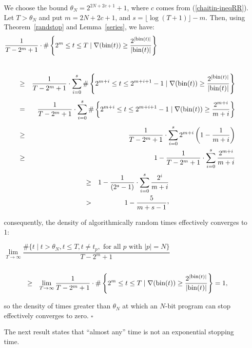 \documentclass[12pt,twoside,openright]{report}
\newcommand{\QED}{\hfill $\square$}
\newcommand{\bin}{\mbox{bin}}
\newcommand{\fbin}{\mbox{\rm \footnotesize{bin}}}
\newcommand{\myproof}{\noindent {\em Proof.}  }
\begin{document}
\myproof We choose the bound $\theta_{N} = 2^{2N+2c+1}+1$, where $c$ comes from (\ref{chaitin-ineqRR}).  Let $T> \theta_{N}$ and put $m = 2N+2c+1$, and $s = \lfloor \log (T+1)\rfloor -m$.  Then, using Theorem~\ref{randstop}  and Lemma~\ref{series}, we have:
\[ \frac{1}{T-2^{m} + 1} \cdot \#\left\{2^{m}\le t\le T \mid \nabla (\bin(t)) \ge \frac{2^{|\fbin (t)|}}{|\bin(t)|}\right\} \phantom{xxxxxxxxxxxxxxxxxxxxxxxx}\]\\[-4ex]
\begin{eqnarray*}
&\ge & \frac{1}{T-2^{m} + 1}\cdot  \sum_{i=0}^{s}\#\left\{2^{m+i}\le t\le 2^{m+i+1}-1\mid \nabla (\bin(t)) \ge \frac{2^{|\fbin (t)|}}{|\bin(t)|}\right\}  \\[1ex]
&= & \frac{1}{T-2^{m} + 1}\cdot \sum_{i=0}^{s}\#\left\{2^{m+i}\le t\le 2^{m+i+1}-1\mid \nabla (\bin(t)) \ge \frac{2^{m+i}}{m+i}\right\}  \\[1ex]
&\ge & \frac{1}{T-2^{m} + 1}\cdot \sum_{i=0}^{s} 2^{m+i} \left( 1 - \frac{1}{m+i}\right)\\
& \ge & 1 - \frac{1}{T-2^{m} + 1}\cdot \sum_{i=0}^{s}   \frac{2^{m+i}}{m+i}
\end{eqnarray*}
\begin{eqnarray*}
&\ge &  1 - \frac{1}{(2^{s} - 1)}\cdot \sum_{i=0}^{s}   \frac{2^{i}}{m+i}\\
&> &  1 - \frac{5}{m+s-1}\raisebox{0.5ex},
\end{eqnarray*}

\noindent consequently, the density of algorithmically random times effectively converges to 1:

\[  \lim_{T \rightarrow \infty} \frac{\#\{t\mid t > \theta_{N}, t\le T, t \not= t_{p}, \mbox{  for all } p \mbox{  with }  |p|=N\}}{T-2^{m} + 1} \phantom{xxxxxxxxxxxxxxxxxxxxxxxxxxxxxxxxxxxxxxxxxxxxxx} \]\\[-7ex]

\begin{eqnarray*}
&\ge & \lim_{T \rightarrow \infty} \frac{1}{T-2^{m} + 1} \cdot \#\left\{2^{m}\le t\le T \mid \nabla (\bin(t)) \ge \frac{2^{|\fbin (t)|}}{|\bin(t)|}\right\} = 1,
\end{eqnarray*}

\noindent so the density of times greater than $\theta_N$ at which an $N$-bit program can stop  effectively converges to zero. 
\QED

\medskip

The next result states that  ``almost any'' time is not an exponential stopping time.

\medskip
\end{document}
